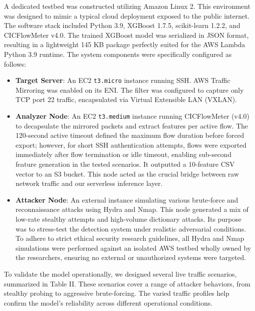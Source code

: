 \documentclass[conference]{IEEEtran}
\begin{document}
A dedicated testbed was constructed utilizing Amazon Linux 2. This environment was designed to mimic a typical cloud deployment exposed to the public internet. The software stack included Python 3.9, XGBoost 1.7.5, scikit-learn 1.2.2, and CICFlowMeter v4.0. The trained XGBoost model was serialized in JSON format, resulting in a lightweight 145 KB package perfectly suited for the AWS Lambda Python 3.9 runtime. The system components were specifically configured as follows:
\begin{itemize}
\item \textbf{Target Server}: An EC2 \texttt{t3.micro} instance running SSH. AWS Traffic Mirroring was enabled on its ENI. The filter was configured to capture only TCP port 22 traffic, encapsulated via Virtual Extensible LAN (VXLAN).
\item \textbf{Analyzer Node}: An EC2 \texttt{t3.medium} instance running CICFlowMeter (v4.0) to decapsulate the mirrored packets and extract features per active flow. The 120-second active timeout defined the maximum flow duration before forced export; however, for short SSH authentication attempts, flows were exported immediately after flow termination or idle timeout, enabling sub-second feature generation in the tested scenarios. It outputted a 10-feature CSV vector to an S3 bucket. This node acted as the crucial bridge between raw network traffic and our serverless inference layer.
\item \textbf{Attacker Node}: An external instance simulating various brute-force and reconnaissance attacks using Hydra and Nmap. This node generated a mix of low-rate stealthy attempts and high-volume dictionary attacks. Its purpose was to stress-test the detection system under realistic adversarial conditions. To adhere to strict ethical security research guidelines, all Hydra and Nmap simulations were performed against an isolated AWS testbed wholly owned by the researchers, ensuring no external or unauthorized systems were targeted.
\end{itemize}

To validate the model operationally, we designed several live traffic scenarios, summarized in Table II. These scenarios cover a range of attacker behaviors, from stealthy probing to aggressive brute-forcing. The varied traffic profiles help confirm the model's reliability across different operational conditions.
\end{document}
